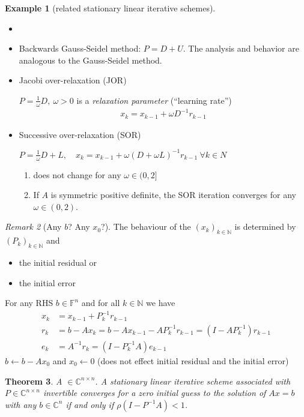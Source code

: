 \documentclass[12pt]{article}
\newcounter{lecture}
\newtheorem{theorem}{Theorem}[lecture]
\theoremstyle{definition}
\newtheorem{example}[theorem]{Example}
\theoremstyle{remark}
\newtheorem{remark}[theorem]{Remark}
\numberwithin{equation}{section}
\newcommand{\F}{\mathbb{F}}
\newcommand{\C}{\mathbb{C}}
\newcommand{\N}{\mathbb{N}}
\begin{document}
\begin{example}[related stationary linear iterative schemes]
  \begin{itemize}
    \item[]
    \item Backwards Gauss-Seidel method: $P = D + U$. The analysis and behavior are analogous to the Gauss-Seidel method.
    \item Jacobi over-relaxation (JOR)

      $P = \frac{1}{\omega}D,\ \omega > 0$ is a \emph{relaxation parameter} (``learning rate'')
      \begin{gather*}
        x_k = x_{k-1} + \omega D^{-1} r_{k-1}
      \end{gather*}
    \item Successive over-relaxation (SOR)

      $P = \frac{1}{\omega}D + L,\quad x_k = x_{k-1} + \omega (D+\omega L)^{-1} r_{k-1} \ \forall k \in N$
      \begin{enumerate}[label={(\roman*)}]
        \item does not change for any $\omega \in (0,2]$
        \item If $A$ is symmetric positive definite, the SOR iteration converges for any $\omega \in (0,2)$.
      \end{enumerate}
  \end{itemize}
\end{example}
\begin{remark}[Any $b$?  Any $x_0$?]
  The behaviour of the $(x_k)_{k \in \N}$ is determined by $(P_k)_{k \in \N}$ and
  \begin{itemize}
    \item the initial residual or
    \item the initial error
  \end{itemize}
  For any RHS $b \in \F^n$ and for all $k \in \N$ we have
  \begin{align*}
    x_k &= x_{k-1} + P_k^{-1} r_{k-1} \\
    r_k &= b - Ax_k = b - Ax_{k-1} - A P_k^{-1} r_{k-1} = (I - AP_k^{-1})r_{k-1} \\
    e_k &= A^{-1}r_k = (I - P_k^{-1}A)e_{k-1}
  \end{align*}
  $b \leftarrow b - Ax_0$ and $x_0 \leftarrow 0$ (does not effect initial residual and the initial error)
\end{remark}

\begin{theorem}
  A $\in \C^{n\times n}$. A \emph{stationary} linear iterative scheme associated with $P \in \C^{n\times n}$ invertible converges for a zero initial guess to the solution of $Ax = b$ with any $b \in \C^n$ if and only if $\rho(I - P^{-1}A) < 1$.
\end{theorem}
\end{document}
